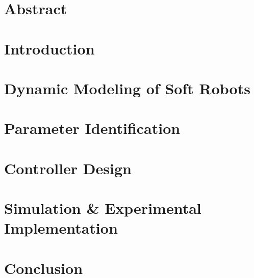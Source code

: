 \documentclass[11pt,twoside]{report}
\begin{document}

\thispagestyle{empty}



\chapter*{Abstract}

\cleardoublepage

\tableofcontents

\cleardoublepage

\cleardoublepage







\chapter{Introduction}

\cleardoublepage

\chapter{Dynamic Modeling of Soft Robots}

\cleardoublepage

\chapter{Parameter Identification}

\cleardoublepage


\chapter{Controller Design}

\cleardoublepage


\chapter{Simulation \& Experimental Implementation}

\cleardoublepage

\chapter{Conclusion}

\cleardoublepage

%
\end{document}
